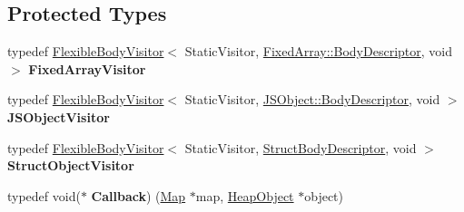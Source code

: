 \subsection*{Protected Types}
\begin{DoxyCompactItemize}
\item 
typedef \hyperlink{classv8_1_1internal_1_1_flexible_body_visitor}{Flexible\+Body\+Visitor}$<$ Static\+Visitor, \hyperlink{classv8_1_1internal_1_1_flexible_body_descriptor}{Fixed\+Array\+::\+Body\+Descriptor}, void $>$ {\bfseries Fixed\+Array\+Visitor}\hypertarget{classv8_1_1internal_1_1_static_marking_visitor_afe4e88973413eac9dcf0ba1605ac914d}{}\label{classv8_1_1internal_1_1_static_marking_visitor_afe4e88973413eac9dcf0ba1605ac914d}

\item 
typedef \hyperlink{classv8_1_1internal_1_1_flexible_body_visitor}{Flexible\+Body\+Visitor}$<$ Static\+Visitor, \hyperlink{classv8_1_1internal_1_1_flexible_body_descriptor}{J\+S\+Object\+::\+Body\+Descriptor}, void $>$ {\bfseries J\+S\+Object\+Visitor}\hypertarget{classv8_1_1internal_1_1_static_marking_visitor_aa868a7b11c9ddc2db4cbb2f5b8c28ed5}{}\label{classv8_1_1internal_1_1_static_marking_visitor_aa868a7b11c9ddc2db4cbb2f5b8c28ed5}

\item 
typedef \hyperlink{classv8_1_1internal_1_1_flexible_body_visitor}{Flexible\+Body\+Visitor}$<$ Static\+Visitor, \hyperlink{classv8_1_1internal_1_1_flexible_body_descriptor}{Struct\+Body\+Descriptor}, void $>$ {\bfseries Struct\+Object\+Visitor}\hypertarget{classv8_1_1internal_1_1_static_marking_visitor_af0f4a595f29ac74ef1c94c3383b06cd9}{}\label{classv8_1_1internal_1_1_static_marking_visitor_af0f4a595f29ac74ef1c94c3383b06cd9}

\item 
typedef void($\ast$ {\bfseries Callback}) (\hyperlink{classv8_1_1internal_1_1_map}{Map} $\ast$map, \hyperlink{classv8_1_1internal_1_1_heap_object}{Heap\+Object} $\ast$object)\hypertarget{classv8_1_1internal_1_1_static_marking_visitor_a0f07d6fde9beb53349a2467a9aec8a88}{}\label{classv8_1_1internal_1_1_static_marking_visitor_a0f07d6fde9beb53349a2467a9aec8a88}

\end{DoxyCompactItemize}
